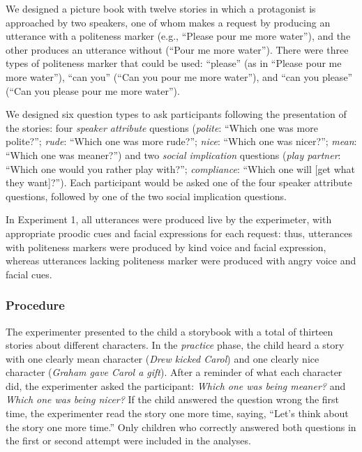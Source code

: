 \documentclass[10pt, letterpaper]{article}
\begin{document}
We designed a picture book with twelve stories in which a protagonist is
approached by two speakers, one of whom makes a request by producing an
utterance with a politeness marker (e.g., ``Please pour me more
water''), and the other produces an utterance without (``Pour me more
water''). There were three types of politeness marker that could be
used: ``please'' (as in ``Please pour me more water''), ``can you''
(``Can you pour me more water''), and ``can you please'' (``Can you
please pour me more water'').

We designed six question types to ask participants following the
presentation of the stories: four \emph{speaker attribute} questions
(\emph{polite}: ``Which one was more polite?''; \emph{rude}: ``Which one
was more rude?''; \emph{nice}: ``Which one was nicer?''; \emph{mean}:
``Which one was meaner?'') and two \emph{social implication} questions
(\emph{play partner}: ``Which one would you rather play with?'';
\emph{compliance}: ``Which one will {[}get what they want{]}?''). Each
participant would be asked one of the four speaker attribute questions,
followed by one of the two social implication questions.

In Experiment 1, all utterances were produced live by the experimeter,
with appropriate proodic cues and facial expressions for each request:
thus, utterances with politeness markers were produced by kind voice and
facial expression, whereas utterances lacking politeness marker were
produced with angry voice and facial cues.

\subsubsection{Procedure}\label{procedure}

The experimenter presented to the child a storybook with a total of
thirteen stories about different characters. In the \emph{practice}
phase, the child heard a story with one clearly mean character
(\emph{Drew kicked Carol}) and one clearly nice character (\emph{Graham
gave Carol a gift}). After a reminder of what each character did, the
experimenter asked the participant: \emph{Which one was being meaner?}
and \emph{Which one was being nicer?} If the child answered the question
wrong the first time, the experimenter read the story one more time,
saying, ``Let's think about the story one more time.'' Only children who
correctly answered both questions in the first or second attempt were
included in the analyses.
\end{document}
